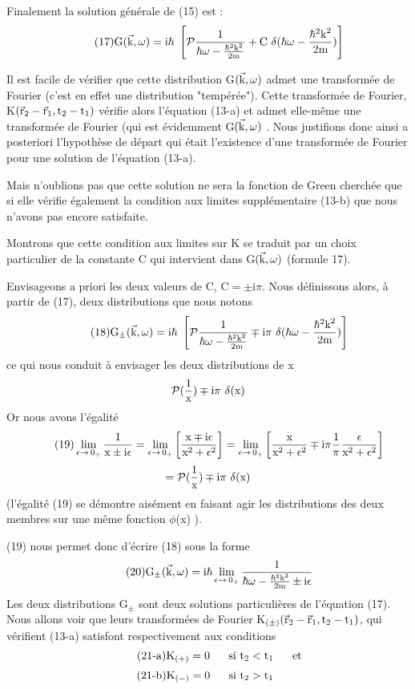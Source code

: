 Finalement la solution générale de (15) est :
\[
\tag{17}\mt{G}(\vec{\mt{k}},\omega)=\mt{i}\hbar\ \left[\mc{P}\frac{1}{\hbar\omega-\frac{\hbar^2\mt{k}^2}{2\mt{m}}}+\mt{C}\ \delta(\hbar\omega-\frac{\hbar^2\mt{k}^2}{2\mt{m}})\right]
\]

Il est facile de vérifier que cette distribution G$(\vec{\text{k}},\omega)$ admet une
transformée de Fourier (c'est en effet une distribution "tempérée").
Cette transformée de Fourier, K$(\vec{\text{r}}_2-\vec{\text{r}}_1,\text{t}_2-\text{t}_1)$ vérifie alors l'équation
(13-a) et admet elle-même une transformée de Fourier (qui est évidemment
G$(\vec{\text{k}},\omega)$ . Nous justifions donc ainsi a posteriori l'hypothèse de départ
qui était l'existence d'une transformée de Fourier pour une solution de
l'équation (13-a).

Mais n'oublions pas que cette solution ne sera la fonction de
Green cherchée que si elle vérifie également la condition aux limites supplémentaire (13-b) que nous n'avons pas encore satisfaite.

Montrons que cette condition aux limites sur K se traduit par
un choix particulier de la constante C qui intervient dans G$(\vec{\text{k}},\omega)$
(formule 17).

Envisageons a priori les deux valeurs de C, C$=\pm$i$\pi$.
Nous définissons alors, à partir de (17), deux distributions que nous notons
\[
\tag{18}\mt{G}_\pm(\vec{\mt{k}},\omega)=\mt{i}\hbar\ \left[\mc{P}\frac{1}{\hbar\omega-\frac{\hbar^2\mt{k}^2}{2\mt{m}}}
\mp\mt{i}\pi\ \delta(\hbar\omega-\frac{\hbar^2\mt{k}^2}{2\mt{m}})\right]
\]
ce qui nous conduit à envisager les deux distributions de x
\[
\mc{P}(\frac{1}{\mt{x}})\mp\mt{i}\pi\ \delta(\mt{x})
\]
Or nous avons l'égalité
\[
\tag{19}\lim_{\epsilon\to\,0_+}\frac{1}{\text{x}\pm\text{i}\epsilon}
=\lim_{\epsilon\to\,0_+}\left[\frac{\text{x}\mp\text{i}\epsilon}{\text{x}^2+\epsilon^2}\right]
=\lim_{\epsilon\to\,0_+}\left[\frac{\text{x}}{\text{x}^2+\epsilon^2}\mp\text{i}\pi\frac{1}{\pi}\frac{\epsilon}{\text{x}^2+\epsilon^2}\right]
\]
\[
=\mc{P}(\frac{1}{\mt{x}})\mp\mt{i}\pi\ \delta(\mt{x})
\]
(l'égalité (19) se démontre aisément en faisant agir les distributions des
deux membres sur une même fonction $\phi$(x) ).

(19) nous permet donc d'écrire (18) sous la forme
\[
\tag{20}\text{G}_\pm(\vec{\text{k}},\omega)=\text{i}\hbar\lim_{\epsilon\to\,0_+}
\frac{1}{\hbar\omega-\frac{\hbar^2\text{k}^2}{2\text{m}}\pm\text{i}\epsilon}
\]
Les deux distributions G$_\pm$ sont deux solutions particulières de l'équation
(17). Nous allons voir que leurs transformées de Fourier K$_{(\pm)}(\vec{\text{r}}_2-\vec{\text{r}}_1,\text{t}_2-\text{t}_1)$,
qui vérifient (13-a) satisfont respectivement aux conditions
\[
\tag{21-a}\text{K}_{(+)}=0\ \ \ \ \ \text{si t}_2<\text{t}_1\ \ \ \ \ \text{et}
\]
\[
\tag{21-b}\text{K}_{(-)}=0\ \ \ \ \ \text{si t}_2>\text{t}_1\ \ \ \ \ \ \ \,
\]

